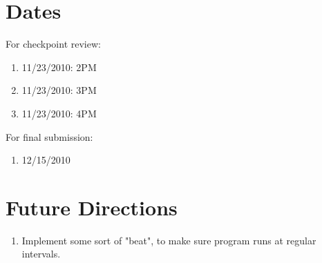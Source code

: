 \documentclass{article}
\begin{document}


\section{Dates} %
\label{sub:dates}

For checkpoint review:

\begin{enumerate}
  \item 11/23/2010: 2PM
  \item 11/23/2010: 3PM
  \item 11/23/2010: 4PM
\end{enumerate}

\noindent For final submission:

\begin{enumerate}
  \item 12/15/2010
\end{enumerate}


\section{Future Directions} %
\label{sec:future_directions}

\begin{enumerate}
  \item Implement some sort of "beat", to make sure program runs at regular intervals.
\end{enumerate}

\end{document}
